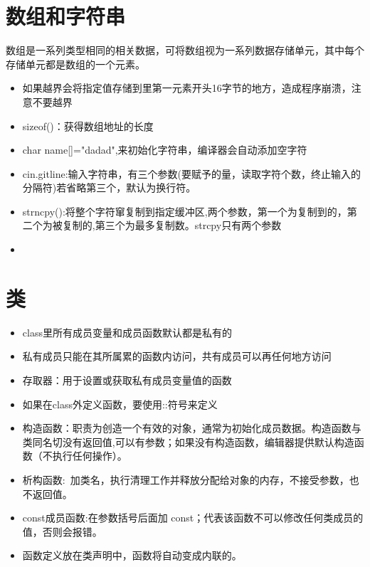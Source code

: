 \documentclass{article}
\begin{document}
\section{数组和字符串}
数组是一系列类型相同的相关数据，可将数组视为一系列数据存储单元，其中每个存储单元都是数组的一个元素。
\begin{itemize}
\item 如果越界会将指定值存储到里第一元素开头16字节的地方，造成程序崩溃，{\red 注意不要越界}
\item sizeof()：获得数组地址的长度
\item char name[]="dadad",来初始化字符串，编译器会自动添加空字符
\item cin.gitline:输入字符串，有三个参数(要赋予的量，读取字符个数，终止输入的分隔符)若省略第三个，默认为换行符。
\item strncpy():将整个字符窜复制到指定缓冲区,两个参数，第一个为复制到的，第二个为被复制的,第三个为最多复制数。strcpy只有两个参数
\item 
\end{itemize}

\section{类}
\begin{itemize}
\item class里所有成员变量和成员函数默认都是私有的
\item 私有成员只能在其所属累的函数内访问，共有成员可以再任何地方访问
\item 存取器：用于设置或获取私有成员变量值的函数
\item 如果在class外定义函数，要使用::符号来定义
\item 构造函数：职责为创造一个有效的对象，通常为初始化成员数据。构造函数与类同名切没有返回值,可以有参数；如果没有构造函数，编辑器提供默认构造函数（不执行任何操作）。
\item 析构函数:~加类名，执行清理工作并释放分配给对象的内存，不接受参数，也不返回值。
\item const成员函数:在参数括号后面加 const；代表该函数不可以修改任何类成员的值，否则会报错。
\item 函数定义放在类声明中，函数将自动变成内联的。
\end{itemize}
\end{document}
